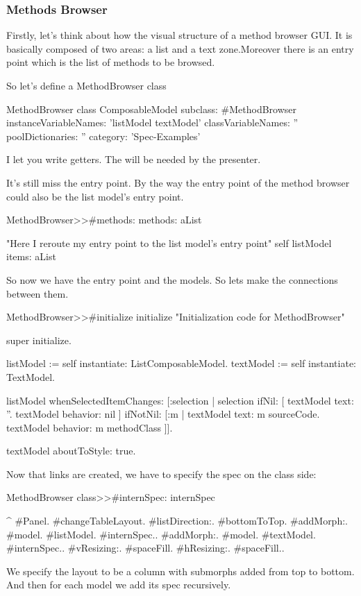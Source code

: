 \documentclass[a4paper,10pt,twoside]{book}
\begin{document}
\subsubsection{Methods Browser}

Firstly, let's think about how the visual structure of a method browser GUI. It is basically composed of two areas: a list and a text zone.Moreover there is an entry point which is the list of methods to be browsed.

So let's define a MethodBrowser class

\begin{classdef}{MethodBrowser class}
ComposableModel subclass: #MethodBrowser
	instanceVariableNames: 'listModel textModel'
	classVariableNames: ''
	poolDictionaries: ''
	category: 'Spec-Examples'
\end{classdef}

I let you write getters. The will be needed by the presenter.

It's still miss the entry point. By the way the entry point of the method browser could also be the list model's entry point.

\begin{method}{MethodBrowser>>\#methods:}
methods: aList

	"Here I reroute my entry point to the list model's entry point"
	self listModel items: aList
\end{method}

So now we have the entry point and the models. So lets make the connections between them.

\begin{method}{MethodBrowser>>\#initialize}
initialize
	"Initialization code for MethodBrowser"

	super initialize.

	listModel := self instantiate: ListComposableModel.
	textModel := self instantiate: TextModel.
		
	listModel whenSelectedItemChanges: [:selection |
		selection
			ifNil: [
				textModel text: ''.
				textModel behavior: nil ]
			ifNotNil: [:m | 
				textModel text: m sourceCode.
				textModel behavior: m methodClass ]].
	
	textModel aboutToStyle: true.
\end{method}

Now that links are created, we have to specify the spec on the class side:

\begin{method}{MethodBrowser class>>\#internSpec:}
internSpec

	^{ #Panel.
			#changeTableLayout.
			#listDirection:. #bottomToTop.
			#addMorph:. {#model. #listModel. #internSpec.}.
			#addMorph:. {#model. #textModel. #internSpec.}.
			#vResizing:. #spaceFill.
			#hResizing:. #spaceFill.}.
\end{method}
%
We specify the layout to be a column with submorphs added from top to bottom. And then for each model we add its spec recursively.
\end{document}
